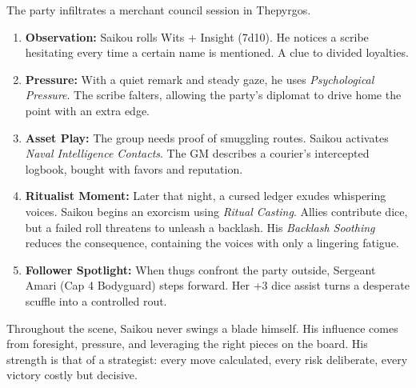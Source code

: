 \documentclass[11pt]{book}
\begin{document}
\begin{tcolorbox}[title=Fictional Snapshot: Captain Saikou Ira in Play,colback=gray!5,colframe=black!60!white]
The party infiltrates a merchant council session in Thepyrgos.
\begin{enumerate}
  \item \textbf{Observation:} Saikou rolls Wits + Insight (7d10). He notices a scribe hesitating every time a certain name is mentioned. A clue to divided loyalties.
  \item \textbf{Pressure:} With a quiet remark and steady gaze, he uses \emph{Psychological Pressure}. The scribe falters, allowing the party's diplomat to drive home the point with an extra edge.
  \item \textbf{Asset Play:} The group needs proof of smuggling routes. Saikou activates \emph{Naval Intelligence Contacts}. The GM describes a courier’s intercepted logbook, bought with favors and reputation.
  \item \textbf{Ritualist Moment:} Later that night, a cursed ledger exudes whispering voices. Saikou begins an exorcism using \emph{Ritual Casting}. Allies contribute dice, but a failed roll threatens to unleash a backlash. His \emph{Backlash Soothing} reduces the consequence, containing the voices with only a lingering fatigue.
  \item \textbf{Follower Spotlight:} When thugs confront the party outside, Sergeant Amari (Cap 4 Bodyguard) steps forward. Her +3 dice assist turns a desperate scuffle into a controlled rout.
\end{enumerate}
Throughout the scene, Saikou never swings a blade himself. His influence comes from foresight, pressure, and leveraging the right pieces on the board. His strength is that of a strategist: every move calculated, every risk deliberate, every victory costly but decisive.
\end{tcolorbox}
\end{document}
